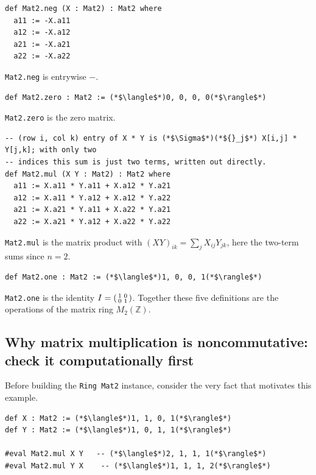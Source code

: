 \begin{lstlisting}
def Mat2.neg (X : Mat2) : Mat2 where
  a11 := -X.a11
  a12 := -X.a12
  a21 := -X.a21
  a22 := -X.a22
\end{lstlisting}

\texttt{Mat2.neg} is entrywise \(-\).

\begin{lstlisting}
def Mat2.zero : Mat2 := (*$\langle$*)0, 0, 0, 0(*$\rangle$*)
\end{lstlisting}

\texttt{Mat2.zero} is the zero matrix.

\begin{lstlisting}
-- (row i, col k) entry of X * Y is (*$\Sigma$*)(*${}_j$*) X[i,j] * Y[j,k]; with only two
-- indices this sum is just two terms, written out directly.
def Mat2.mul (X Y : Mat2) : Mat2 where
  a11 := X.a11 * Y.a11 + X.a12 * Y.a21
  a12 := X.a11 * Y.a12 + X.a12 * Y.a22
  a21 := X.a21 * Y.a11 + X.a22 * Y.a21
  a22 := X.a21 * Y.a12 + X.a22 * Y.a22
\end{lstlisting}

\texttt{Mat2.mul} is the matrix product with \((XY)_{ik} = \sum_j X_{ij}Y_{jk}\), here the two-term sums since \(n = 2\).

\begin{lstlisting}
def Mat2.one : Mat2 := (*$\langle$*)1, 0, 0, 1(*$\rangle$*)
\end{lstlisting}

\texttt{Mat2.one} is the identity \(I = \begin{psmallmatrix}1&0\\0&1\end{psmallmatrix}\). Together these five definitions are the operations of the matrix ring \(M_2(\mathbb{Z})\).

\subsection{Why matrix multiplication is noncommutative: check it computationally first}\label{sec:09-rings:07-matrices:3}

Before building the \texttt{Ring Mat2} instance, consider the very fact that motivates this example.

\begin{lstlisting}
def X : Mat2 := (*$\langle$*)1, 1, 0, 1(*$\rangle$*)
def Y : Mat2 := (*$\langle$*)1, 0, 1, 1(*$\rangle$*)

#eval Mat2.mul X Y   -- (*$\langle$*)2, 1, 1, 1(*$\rangle$*)
#eval Mat2.mul Y X    -- (*$\langle$*)1, 1, 1, 2(*$\rangle$*)
\end{lstlisting}

